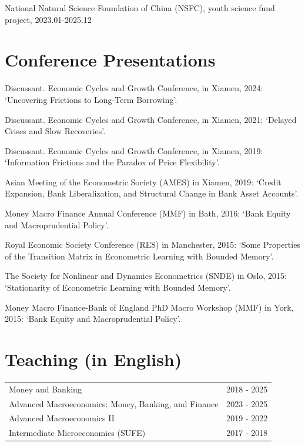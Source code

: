 \documentclass[11pt]{article}
\begin{document}
\begin{enumerate}[label={[\arabic*]}]
\item National Natural Science Foundation of China (NSFC), youth science fund project, 2023.01-2025.12
\end{enumerate}


\section*{Conference Presentations}
\begin{enumerate}[label={[\arabic*]}]
\item { Discussant. Economic Cycles and Growth Conference, in Xiamen, 2024: `Uncovering Frictions to Long-Term Borrowing'.}
\item { Discussant. Economic Cycles and Growth Conference, in Xiamen, 2021: `Delayed Crises and Slow Recoveries'.}
\item { Discussant. Economic Cycles and Growth Conference, in Xiamen, 2019: `Information Frictions and the Paradox of Price Flexibility'.}
\item { Asian Meeting of the Econometric Society (AMES) in Xiamen, 2019: `Credit Expansion, Bank Liberalization, and Structural Change in Bank Asset Accounts'.}
\item { Money Macro Finance Annual Conference (MMF) in Bath, 2016: `Bank Equity and Macroprudential Policy'.}
\item { Royal Economic Society Conference (RES) in Manchester, 2015: `Some Properties of the Transition Matrix in Econometric Learning with Bounded Memory'.}
\item { The Society for Nonlinear and Dynamics Econometrics (SNDE) in Oslo, 2015: `Stationarity of Econometric Learning with Bounded Memory'.}
\item { Money Macro Finance-Bank of England PhD Macro Workshop (MMF) in York, 2015: `Bank Equity and Macroprudential Policy'.}
\end{enumerate}

\section*{Teaching (in English)}
\begin{tabular}{L{11cm} L{4cm}}
Money and Banking & 2018 - 2025 \\
Advanced Macroeconomics: Money, Banking, and Finance & 2023 - 2025 \\
Advanced Macroeconomics II & 2019 - 2022 \\
Intermediate Microeconomics (SUFE) & 2017 - 2018 \\
\end{tabular}
\end{document}
